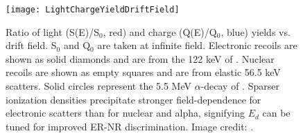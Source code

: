 \begin{figure}
\centering
\texttt{[image: LightChargeYieldDriftField]}
\caption{Ratio of light (S(E)/S$_{0}$, red) and charge (Q(E)/Q$_{0}$, blue) yields vs. drift field.  S$_{0}$ and Q$_{0}$ are taken at
infinite field.  Electronic recoils are shown as solid diamonds and are from the 122 keV \gammaray of .  Nuclear recoils
are shown as empty squares and are from elastic 56.5 keV scatters.  Solid circles represent the 5.5 MeV $\alpha$-decay of
.  Sparser ionization densities precipitate stronger field-dependence for electronic scatters than for nuclear and
alpha, signifying $E_{d}$ can be tuned for improved ER-NR discrimination.  Image credit: .}
\label{fig:tpcs_signals_drift_field}
\end{figure}






































